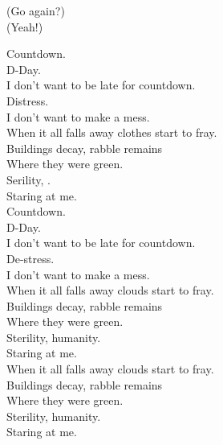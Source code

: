
\label{album:sketches-of-brunswick-east}




(Go again?) \\
(Yeah!) \\






Countdown. \\
D-Day. \\
I don't want to be late for countdown. \\
Distress. \\
I don't want to make a mess. \\

When it all falls away clothes start to fray. \\
Buildings decay, rabble remains \\
Where they were green. \\
Serility, . \\
Staring at me. \\

Countdown. \\
D-Day. \\
I don't want to be late for countdown. \\
De-stress. \\
I don't want to make a mess. \\

When it all falls away clouds start to fray. \\
Buildings decay, rabble remains \\
Where they were green. \\
Sterility, humanity. \\
Staring at me. \\

When it all falls away clouds start to fray. \\
Buildings decay, rabble remains \\
Where they were green. \\
Sterility, humanity. \\
Staring at me. \\

